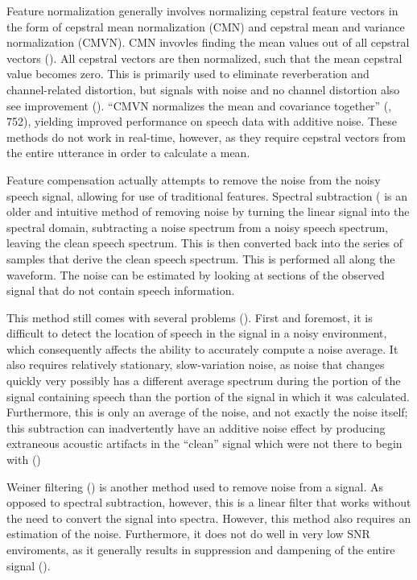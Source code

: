\documentclass[dissertation,copyright]{uathesis}
\begin{document}
Feature normalization generally involves normalizing cepstral feature vectors in the form of cepstral mean normalization (CMN) and cepstral mean and variance normalization (CMVN).  CMN invovles finding the mean values out of all cepstral vectors (\cite{atal:74}).  All cepstral vectors are then normalized, such that the mean cepstral value becomes zero.  This is primarily used to eliminate reverberation and channel-related distortion, but signals with noise and no channel distortion also see improvement (\cite{droppo:08}).  ``CMVN normalizes the mean and covariance together'' (\cite{li:14}, 752), yielding improved performance on speech data with additive noise.
These methods do not work in real-time, however, as they require cepstral vectors from the entire utterance in order to calculate a mean.

Feature compensation actually attempts to remove the noise from the noisy speech signal, allowing for use of traditional features. Spectral subtraction (\cite{boll:79} is an older and intuitive method of removing noise by turning the linear signal into the spectral domain, subtracting a noise spectrum from a noisy speech spectrum, leaving the clean speech spectrum.  This is then converted back into the series of samples that derive the clean speech spectrum.  This is performed all along the waveform.  The noise can be estimated by looking at sections of the observed signal that do not contain speech information.  

This method still comes with several problems (\cite{li:14}). First and foremost, it is difficult to detect the location of speech in the signal in a noisy environment, which consequently affects the ability to accurately compute a noise average. It also requires relatively stationary, slow-variation noise, as noise that changes quickly very possibly has a different average spectrum during the portion of the signal containing speech than the portion of the signal in which it was calculated.  Furthermore, this is only an average of the noise, and not exactly the noise itself; this subtraction can inadvertently have an additive noise effect by producing extraneous acoustic artifacts in the ``clean'' signal which were not there to begin with (\cite{berouti:79})

Weiner filtering (\cite{weiner:79}) is another method used to remove noise from a signal.  As opposed to spectral subtraction, however, this is a linear filter that works without the need to convert the signal into spectra.  However, this method also requires an estimation of the noise.  Furthermore, it does not do well in very low SNR enviroments, as it generally results in suppression and dampening of the entire signal (\cite{li:14}).
\end{document}
